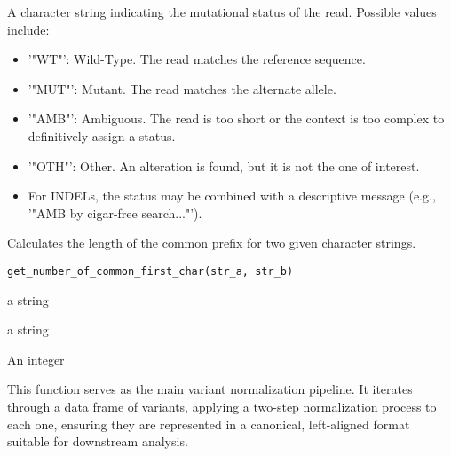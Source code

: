 \documentclass[a4paper]{book}
\begin{document}
%
\begin{Value}
A character string indicating the mutational status of the read. Possible values include:
\begin{itemize}

\item{} '"WT"': Wild-Type. The read matches the reference sequence.
\item{} '"MUT"': Mutant. The read matches the alternate allele.
\item{} '"AMB"': Ambiguous. The read is too short or the context is too complex to definitively assign a status.
\item{} '"OTH"': Other. An alteration is found, but it is not the one of interest.
\item{} For INDELs, the status may be combined with a descriptive message (e.g., '"AMB by cigar-free search..."').

\end{itemize}

\end{Value}
%
\begin{Description}
Calculates the length of the common prefix for two given character strings.
\end{Description}
%
\begin{Usage}
\begin{verbatim}
get_number_of_common_first_char(str_a, str_b)
\end{verbatim}
\end{Usage}
%
\begin{Arguments}
\begin{ldescription}
\item[\code{str\_a}] a string

\item[\code{str\_b}] a string
\end{ldescription}
\end{Arguments}
%
\begin{Value}
An integer
\end{Value}
%
\begin{Description}
This function serves as the main variant normalization pipeline. It iterates through a data frame of variants,
applying a two-step normalization process to each one, ensuring they are represented in a canonical, left-aligned
format suitable for downstream analysis.
\end{Description}
\end{document}
